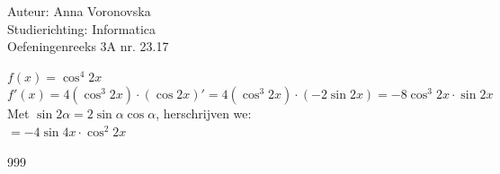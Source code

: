 \documentclass[a4paper]{article}
\begin{document}
\noindent \large Auteur: Anna Voronovska \\
\noindent \large Studierichting: Informatica \\
\noindent \large Oefeningenreeks 3A nr. 23.17 \\

\medskip 

\normalsize

$f(x) = \cos^4 2x$\\

$f'(x) = 4 (\cos^3 2x) \cdot (\cos 2x)'= 4( \cos^3 2x) \cdot (-2\sin 2x)= -8 \cos^3 2x \cdot \sin 2x$\\

Met $ \sin 2\alpha = 2 \sin \alpha \cos \alpha $, herschrijven we:\\

$= -4 \sin 4x \cdot \cos^2 2x$\\



\begin{thebibliography}{999}
\end{thebibliography}
\end{document}
